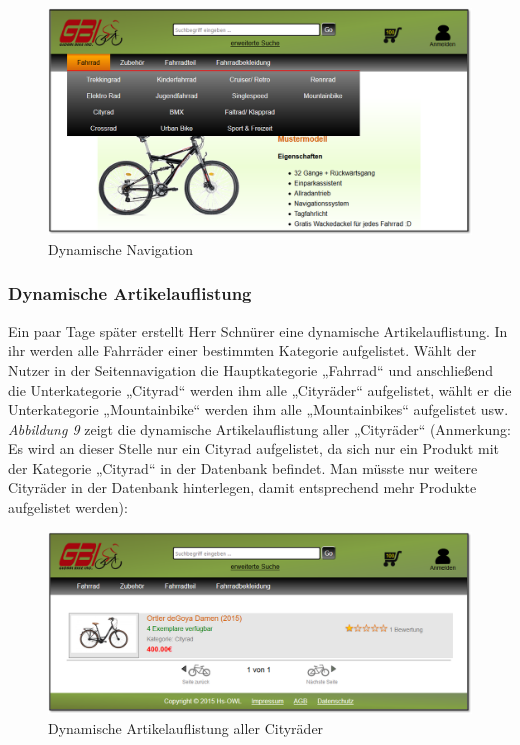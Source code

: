 \begin{figure}[H]
\begin{center}
\includegraphics[width=150mm]{Bilder/Abbildung9-DynamischeNaviagtionDesWebshops.png}
\end{center}
\caption{Dynamische Navigation}
\label{Abbildung9-Dynamische Navigation}
\end{figure}


\subsubsection{Dynamische Artikelauflistung}

Ein paar Tage später erstellt Herr Schnürer eine dynamische Artikelauflistung. In ihr werden alle Fahrräder einer bestimmten Kategorie aufgelistet. Wählt der Nutzer in der Seitennavigation die Hauptkategorie „Fahrrad“ und anschließend die Unterkategorie „Cityrad“ werden ihm alle „Cityräder“ aufgelistet, wählt er die Unterkategorie „Mountainbike“ werden ihm alle „Mountainbikes“ aufgelistet usw. \textit{Abbildung 9} zeigt die dynamische Artikelauflistung aller „Cityräder“ (Anmerkung: Es wird an dieser Stelle nur ein Cityrad aufgelistet, da sich nur ein Produkt mit der Kategorie „Cityrad“ in der Datenbank befindet. Man müsste nur weitere Cityräder in der Datenbank hinterlegen, damit entsprechend mehr Produkte aufgelistet werden):

\begin{figure}[H]
\begin{center}
\includegraphics[width=150mm]{Bilder/Abbildung10-DynamischeArtikelauflistungAllerCitybikes.png}
\end{center}
\caption{Dynamische Artikelauflistung aller Cityräder}
\label{Abbildung10-Dynamische Artikelauflistung aller Cityräder}
\end{figure}


